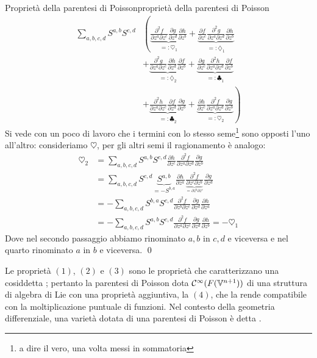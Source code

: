 \documentclass[openany]{book}
\renewcommand\C{\mc{C}}
\renewcommand\V{\mathbb{V}}
\begin{document}
\begin{proposition}{Proprietà della parentesi di Poisson}{proprietà della parentesi di Poisson}
    \begin{align*}
        \sum_{a,b,c,d}S^{a,b}S^{c,d} & \left( \underbrace{\frac{\partial^2 f}{\partial z^a \partial z^c} \frac{\partial g}{\partial z^d} \frac{\partial h}{\partial z^b}}_{=: \heartsuit_1} + \underbrace{\frac{\partial f}{\partial z^c}\frac{\partial^2 g}{\partial z^a\partial z^d}\frac{\partial h}{\partial z^b}}_{=:\diamondsuit_1} \right. \\
        & + \underbrace{\frac{\partial^2 g}{\partial z^a \partial z^c} \frac{\partial h}{\partial z^d} \frac{\partial f}{\partial z^b}}_{=: \diamondsuit_2} + \underbrace{\frac{\partial g}{\partial z^c}\frac{\partial^2 h}{\partial z^a\partial z^d}\frac{\partial f}{\partial z^b}}_{=:\clubsuit_1} \\
        & \left. + \underbrace{\frac{\partial^2 h}{\partial z^a \partial z^c} \frac{\partial f}{\partial z^d} \frac{\partial g}{\partial z^b}}_{=: \clubsuit_2} + \underbrace{\frac{\partial h}{\partial z^c}\frac{\partial^2 f}{\partial z^a\partial z^d}\frac{\partial g}{\partial z^b}}_{=:\heartsuit_2} \right)
    \end{align*} 
    Si vede con un poco di lavoro che i termini con lo stesso seme\footnote{a dire il vero, una volta messi in sommatoria} sono opposti l'uno all'altro: consideriamo $\heartsuit$, per gli altri semi il ragionamento è analogo:
    \begin{align*}
        \heartsuit_2 & = \sum_{a,b,c,d} S^{a,b}S^{c,d} \frac{\partial h}{\partial z^c}\frac{\partial^2 f}{\partial z^a\partial z^d}\frac{\partial g}{\partial z^b} \\
        & = \sum_{a,b,c,d} S^{c,d}\underbrace{S^{a,b}}_{= -S^{b,a}} \frac{\partial h}{\partial z^a}\frac{\partial^2 f}{\underbrace{\partial z^c\partial z^b}_{= \partial z^b \partial z^c}}\frac{\partial g}{\partial z^d} \\
        & = -\sum_{a,b,c,d} S^{b,a}S^{c,d} \frac{\partial^2 f}{\partial z^b \partial z^c } \frac{\partial g}{\partial z^d}\frac{\partial h}{\partial z^a} \\
        & = -\sum_{a,b,c,d} S^{a,b}S^{c,d} \frac{\partial^2 f}{\partial z^a \partial z^c } \frac{\partial g}{\partial z^d}\frac{\partial h}{\partial z^b} = - \heartsuit_1
    \end{align*}
    Dove nel secondo passaggio abbiamo rinominato $a,b$ in $c,d$ e viceversa e nel quarto rinominato $a$ in $b$ e viceversa.
    \qed
\end{proposition}

Le proprietà $(1)$, $(2)$ e $(3)$ sono le proprietà che caratterizzano una cosiddetta ; pertanto la parentesi di Poisson dota $\C^{\infty}(F(\V^{n+1}))$ di una struttura di algebra di Lie con una proprietà aggiuntiva, la $(4)$, che la rende compatibile con la moltiplicazione puntuale di funzioni. Nel contesto della geometria differenziale, una varietà dotata di una parentesi di Poisson è detta .
\end{document}
